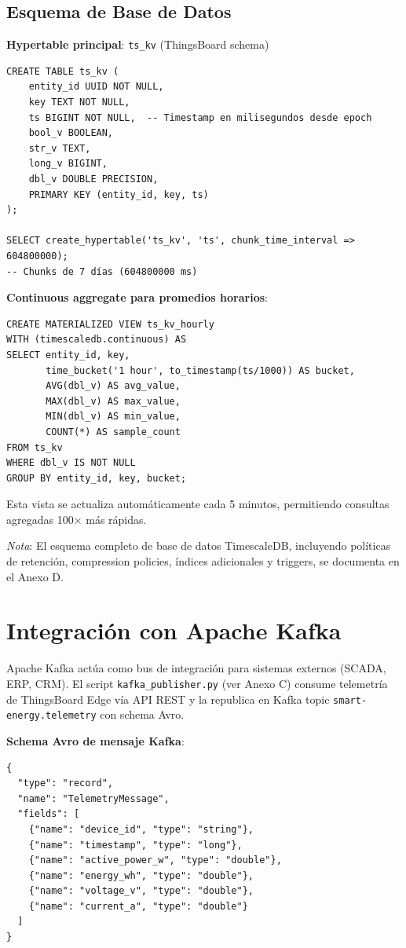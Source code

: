 \subsection{Esquema de Base de Datos}

\textbf{Hypertable principal}: \texttt{ts\_kv} (ThingsBoard schema)

\begin{verbatim}
CREATE TABLE ts_kv (
    entity_id UUID NOT NULL,
    key TEXT NOT NULL,
    ts BIGINT NOT NULL,  -- Timestamp en milisegundos desde epoch
    bool_v BOOLEAN,
    str_v TEXT,
    long_v BIGINT,
    dbl_v DOUBLE PRECISION,
    PRIMARY KEY (entity_id, key, ts)
);

SELECT create_hypertable('ts_kv', 'ts', chunk_time_interval => 604800000);
-- Chunks de 7 días (604800000 ms)
\end{verbatim}

\textbf{Continuous aggregate para promedios horarios}:

\begin{verbatim}
CREATE MATERIALIZED VIEW ts_kv_hourly
WITH (timescaledb.continuous) AS
SELECT entity_id, key,
       time_bucket('1 hour', to_timestamp(ts/1000)) AS bucket,
       AVG(dbl_v) AS avg_value,
       MAX(dbl_v) AS max_value,
       MIN(dbl_v) AS min_value,
       COUNT(*) AS sample_count
FROM ts_kv
WHERE dbl_v IS NOT NULL
GROUP BY entity_id, key, bucket;
\end{verbatim}

Esta vista se actualiza automáticamente cada 5 minutos, permitiendo consultas agregadas 100$\times$ más rápidas.

\textit{Nota}: El esquema completo de base de datos TimescaleDB, incluyendo políticas de retención, compression policies, índices adicionales y triggers, se documenta en el Anexo D.

\section{Integración con Apache Kafka}

Apache Kafka actúa como bus de integración para sistemas externos (SCADA, ERP, CRM). El script \texttt{kafka\_publisher.py} (ver Anexo C) consume telemetría de ThingsBoard Edge vía API REST y la republica en Kafka topic \texttt{smart-energy.telemetry} con schema Avro.

\textbf{Schema Avro de mensaje Kafka}:

\begin{verbatim}
{
  "type": "record",
  "name": "TelemetryMessage",
  "fields": [
    {"name": "device_id", "type": "string"},
    {"name": "timestamp", "type": "long"},
    {"name": "active_power_w", "type": "double"},
    {"name": "energy_wh", "type": "double"},
    {"name": "voltage_v", "type": "double"},
    {"name": "current_a", "type": "double"}
  ]
}
\end{verbatim}

